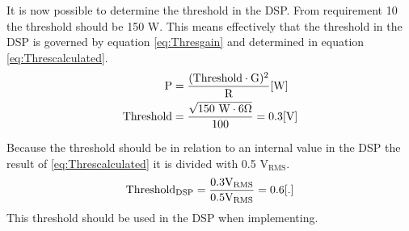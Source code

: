 It is now possible to determine the threshold in the DSP. From requirement 10 the threshold should be 150 W.  This means effectively that the threshold in the DSP is governed by equation \ref{eq:Thresgain} and determined in equation \ref{eq:Threscalculated}.
\vspace{-3mm}
\begin{align}
\text{P}&=\frac{(\text{Threshold} \cdot \text{G})^2}{\text{R}} \enhed{W}\label{eq:Thresgain}
\\
\text{\text{Threshold}}&=\frac{\sqrt{150 \text{ W} \cdot 6 \Omega }}{100}=0.3\enhed{V}\label{eq:Threscalculated}
\end{align}
\begin{where}
\end{where}
Because the threshold should be in relation to an internal value in the DSP the result of \autoref{eq:Threscalculated} it is divided with 0.5 $\text{V}_\text{RMS}$.
\begin{equation}
\text{Threshold}_\text{DSP}= \frac{0.3 \text{V}_\text{RMS}}{0.5 \text{V}_\text{RMS}} = 0.6 \enhed{.}
\end{equation}
This threshold should be used in the DSP when implementing.




